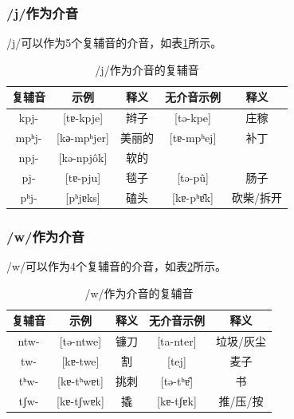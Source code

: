 \subsubsection{/j/作为介音}

/j/可以作为5个复辅音的介音，如表\ref{jmid}所示。

\begin{table}[H]
\vspace{5pt}
    \centering
    \caption{/j/作为介音的复辅音}
    \label{jmid}
\begin{tabular}{c|cccc}
     \toprule
复辅音   & 示例              & 释义   & 无介音示例          & 释义        \\
     \midrule
	kpj-  & {[}tɐ-kpje{]}   & 辫子  & {[}tə-kpe{]}   & 庄稼    \\
mpʰj- & {[}kә-mpʰjer{]} & 美丽的 & {[}tɐ-mpʰej{]} & 补丁    \\
npj-  & {[}kə-npjôk{]} & 软的  &                &       \\
pj-   & {[}tɐ-pju{]}    & 毯子  & {[}tə-pû{]}   & 肠子    \\
pʰj-  & {[}pʰjɐks{]}    & 磕头  & {[}kɐ-pʰɐ̂k{]} & 砍柴/拆开 \\
   \bottomrule
\end{tabular}
\end{table}

\subsubsection{/w/作为介音}

/w/可以作为4个复辅音的介音，如表\ref{wmid}所示。

\begin{table}[H]
\vspace{5pt}
    \centering
    \caption{/w/作为介音的复辅音}
    \label{wmid}
\begin{tabular}{c|cccc}
     \toprule
复辅音   & 示例              & 释义   & 无介音示例          & 释义        \\
     \midrule
	ntw- & {[}tə-ntwe{]}   & 镰刀 & {[}ta-nter{]}  & 垃圾/灰尘 \\
tw-  & {[}kɐ-twe{]}    & 割  & {[}tej{]}      & 麦子    \\
tʰw- & {[}kɐ-tʰwɐt{]}  & 挑刺 & {[}tə-tʰɐ̂{]}  & 书     \\
tʃw- & {[}kɐ-tʃwɐk{]}  & 撬  & {[}kɐ-tʃɐk{]}  & 推/压/按 \\
   \bottomrule
\end{tabular}
\end{table}

